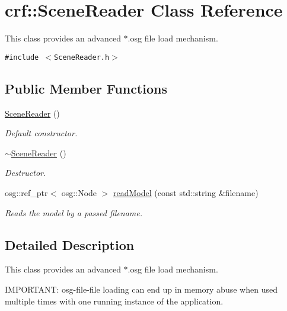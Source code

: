 \hypertarget{a00015}{
\section{crf::SceneReader Class Reference}
\label{a00015}
}
This class provides an advanced $\ast$.osg file load mechanism.  


{\tt \#include $<$SceneReader.h$>$}

\subsection*{Public Member Functions}
\begin{CompactItemize}
\item 
\hypertarget{a00015_1d99eb0e15dc12f7f60cf4a7e9fc17d5}{
\hyperlink{a00015_1d99eb0e15dc12f7f60cf4a7e9fc17d5}{SceneReader} ()}
\label{a00015_1d99eb0e15dc12f7f60cf4a7e9fc17d5}

\begin{CompactList}\small\item\em Default constructor. \item\end{CompactList}\item 
\hypertarget{a00015_2b3bfe0495f724223c8b846b7637b242}{
\hyperlink{a00015_2b3bfe0495f724223c8b846b7637b242}{$\sim$SceneReader} ()}
\label{a00015_2b3bfe0495f724223c8b846b7637b242}

\begin{CompactList}\small\item\em Destructor. \item\end{CompactList}\item 
osg::ref\_\-ptr$<$ osg::Node $>$ \hyperlink{a00015_8ca1f3b1c2a9940175cc4d978ad68098}{readModel} (const std::string \&filename)
\begin{CompactList}\small\item\em Reads the model by a passed filename. \item\end{CompactList}\end{CompactItemize}


\subsection{Detailed Description}
This class provides an advanced $\ast$.osg file load mechanism. 

IMPORTANT: osg-file-file loading can end up in memory abuse when used multiple times with one running instance of the application. 

